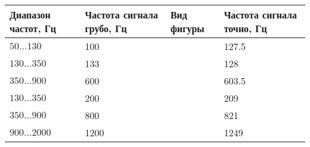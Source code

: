 \begin{table}[h]
	\caption{}
	\begin{tabular}{|p{4cm}|p{4cm}|p{4cm}|p{4cm}|}
		\hline
		Диапазон частот, Гц & Частота сигнала грубо, Гц & Вид фигуры & Частота сигнала точно, Гц \\ \hline
		$50 \dots 130  $ & 100 & & 127.5 \\ [50pt] \hline
		$130 \dots 350  $ & 133 & & 128 \\ [50pt] \hline
		$350 \dots 900  $ & 600 & & 603.5 \\ [50pt] \hline
		$130 \dots 350  $ & 200 & & 209 \\ [50pt] \hline
		$350 \dots 900  $ & 800 & & 821 \\ [50pt] \hline
		$900 \dots 2000  $ & 1200 & & 1249 \\ [50pt] \hline		
	\end{tabular}
\end{table}